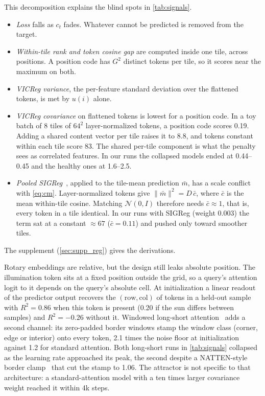 This decomposition explains the blind spots in \cref{tab:signals}.
\begin{itemize}[leftmargin=*,itemsep=1pt,topsep=2pt]
  \item \emph{Loss} falls as $c_t$ fades. Whatever cannot be predicted is removed from the target.
  \item \emph{Within-tile rank and token cosine gap} are computed inside one tile, across positions. A position code has $G^2$ distinct tokens per tile, so it scores near the maximum on both.
  \item \emph{VICReg variance}, the per-feature standard deviation over the flattened tokens, is met by $u(i)$ alone.
  \item \emph{VICReg covariance} on flattened tokens is lowest for a position code. In a toy batch of 8 tiles of $64^2$ layer-normalized tokens, a position code scores 0.19. Adding a shared content vector per tile raises it to 8.8, and tokens constant within each tile score 83. The shared per-tile component is what the penalty sees as correlated features. In our runs the collapsed models ended at 0.44--0.45 and the healthy ones at 1.6--2.5.
  \item \emph{Pooled SIGReg}~\cite{balestriero2025lejepa}, applied to the tile-mean prediction $\bar m$, has a scale conflict with \cref{eq:cm}. Layer-normalized tokens give $\|\bar m\|^2 = D\,\bar c$, where $\bar c$ is the mean within-tile cosine. Matching $\mathcal{N}(0, I)$ therefore needs $\bar c \approx 1$, that is, every token in a tile identical. In our runs with SIGReg (weight 0.003) the term sat at a constant ${\approx}67$ ($\bar c{=}0.11$) and pushed only toward smoother tiles.
\end{itemize}
The supplement (\cref{sec:supp_reg}) gives the derivations.

Rotary embeddings are relative, but the design still leaks absolute position. The illumination token sits at a fixed position outside the grid, so a query's attention logit to it depends on the query's absolute cell. At initialization a linear readout of the predictor output recovers the $(\text{row}, \text{col})$ of tokens in a held-out sample with $R^2{=}0.86$ when this token is present (0.20 if the sun differs between samples) and $R^2{=}{-}0.26$ without it. Windowed long-short attention~\cite{zhu2021long} adds a second channel: its zero-padded border windows stamp the window class (corner, edge or interior) onto every token, 2.1 times the noise floor at initialization against 1.2 for standard attention. Both long-short runs in \cref{tab:signals} collapsed as the learning rate approached its peak, the second despite a NATTEN-style border clamp~\cite{hassani2023neighborhood} that cut the stamp to 1.06. The attractor is not specific to that architecture: a standard-attention model with a ten times larger covariance weight reached it within 4k steps.

